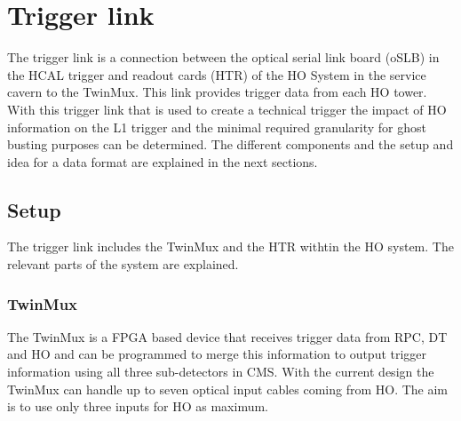 \section{Trigger link}
The trigger link is a connection between the optical serial link board (oSLB) in the HCAL trigger and readout cards (HTR) of the HO System in the service cavern to the TwinMux. This link provides trigger data from each HO tower.\\
With this trigger link that is used to create a technical trigger the impact of HO information on the L1 trigger and the minimal required granularity for ghost busting purposes can be determined.
The different components and the setup and idea for a data format are explained in the next sections.
\subsection{Setup}
The trigger link includes the TwinMux and the HTR withtin the HO system. The relevant parts of the system are explained.
\subsubsection{TwinMux}
The TwinMux is a FPGA based device that receives trigger data from RPC, DT and HO and can be programmed to merge this information to output trigger information using all three sub-detectors in CMS. With the current design the TwinMux can handle up to seven optical input cables coming from HO. The aim is to use only three inputs for HO as maximum.
